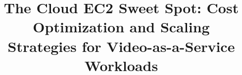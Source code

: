 \documentclass[conference]{IEEEtran}
\begin{document}
\title{The Cloud EC2 Sweet Spot: Cost Optimization and Scaling Strategies for Video-as-a-Service Workloads}

\author{
}

\maketitle

\end{document}
